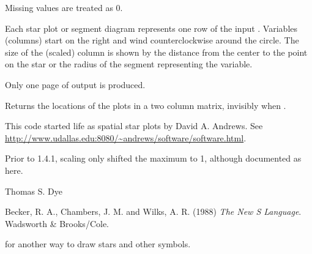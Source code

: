 %
\begin{Details}\relax
Missing values are treated as 0.

Each star plot or segment diagram represents one row of the input
.  Variables (columns) start on the right and wind
counterclockwise around the circle.  The size of the (scaled) column
is shown by the distance from the center to the point on the star or
the radius of the segment representing the variable.

Only one page of output is produced.
\end{Details}
%
\begin{Value}
Returns the locations of the plots in a two column matrix, invisibly
when .
\end{Value}
%
\begin{Note}\relax
This code started life as spatial star plots by David A. Andrews.
See \url{http://www.udallas.edu:8080/~andrews/software/software.html}.

Prior to 1.4.1, scaling only shifted the maximum to 1, although
documented as here.
\end{Note}
%
\begin{Author}\relax
Thomas S. Dye
\end{Author}
%
\begin{References}\relax
Becker, R. A., Chambers, J. M. and Wilks, A. R. (1988)
\emph{The New S Language}.
Wadsworth \& Brooks/Cole.
\end{References}
%
\begin{SeeAlso}\relax
{} for another way to draw stars and other symbols.
\end{SeeAlso}
%
